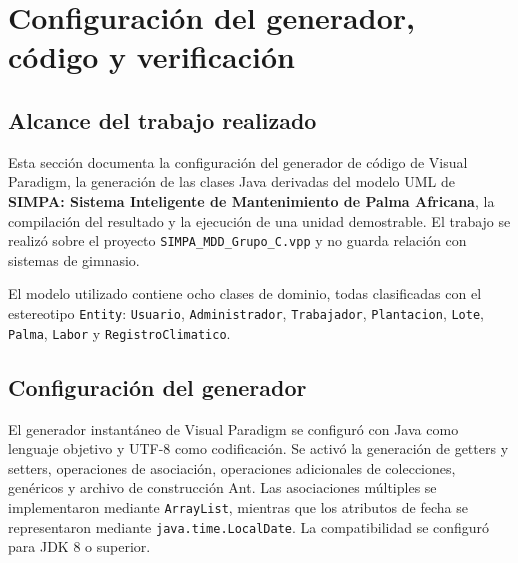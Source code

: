 
\section{Configuración del generador, código y verificación}

\subsection{Alcance del trabajo realizado}

Esta sección documenta la configuración del generador de código de Visual Paradigm, la generación de las clases Java derivadas del modelo UML de \textbf{SIMPA: Sistema Inteligente de Mantenimiento de Palma Africana}, la compilación del resultado y la ejecución de una unidad demostrable. El trabajo se realizó sobre el proyecto \texttt{SIMPA\_MDD\_Grupo\_C.vpp} y no guarda relación con sistemas de gimnasio.

El modelo utilizado contiene ocho clases de dominio, todas clasificadas con el estereotipo \texttt{Entity}: \texttt{Usuario}, \texttt{Administrador}, \texttt{Trabajador}, \texttt{Plantacion}, \texttt{Lote}, \texttt{Palma}, \texttt{Labor} y \texttt{RegistroClimatico}.

\subsection{Configuración del generador}

El generador instantáneo de Visual Paradigm se configuró con Java como lenguaje objetivo y UTF-8 como codificación. Se activó la generación de getters y setters, operaciones de asociación, operaciones adicionales de colecciones, genéricos y archivo de construcción Ant. Las asociaciones múltiples se implementaron mediante \texttt{ArrayList}, mientras que los atributos de fecha se representaron mediante \texttt{java.time.LocalDate}. La compatibilidad se configuró para JDK 8 o superior.

